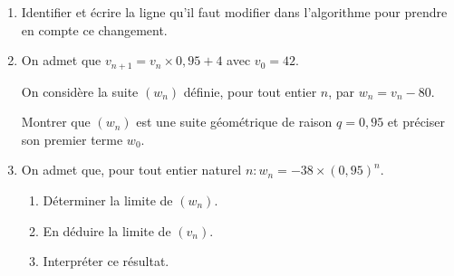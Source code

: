 \begin{enumerate}
     \item
     Identifier et écrire la ligne qu'il faut modifier dans l'algorithme pour prendre en compte ce changement.
     \item
     On admet que $v_{n+1}=v_{n}\times 0,95+4$ avec $v_{0}=42$.
     \par
     On considère la suite $\left(w_{n}\right)$ définie, pour tout entier $n$, par $w_{n}=v_{n}-80$.
     \par
     Montrer que $\left(w_{n}\right)$ est une suite géométrique de raison $q=0,95$ et préciser son premier terme $w_{0}$.
     \item
     On admet que, pour tout entier naturel $n : w_{n}=-38\times \left(0,95\right)^{n}$.
     \begin{enumerate}
          \item
          Déterminer la limite de $\left(w_{n}\right)$.
          \item
          En déduire la limite de $\left(v_{n}\right)$.
          \item
          Interpréter ce résultat.
     \end{enumerate}
\end{enumerate}
